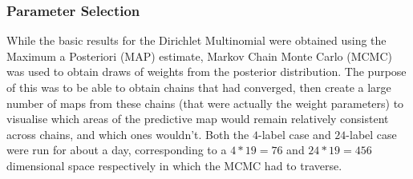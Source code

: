 \subsubsection{Parameter Selection}

While the basic results for the Dirichlet Multinomial were obtained using the Maximum a Posteriori (MAP) estimate, Markov Chain Monte Carlo (MCMC) was used to obtain draws of weights from the posterior distribution. The purpose of this was to be able to obtain chains that had converged, then create a large number of maps from these chains (that were actually the weight parameters) to visualise which areas of the predictive map would remain relatively consistent across chains, and which ones wouldn't. Both the $4$-label case and $24$-label case were run for about a day, corresponding to a $4*19=76$ and $24*19=456$ dimensional space respectively in which the MCMC had to traverse.



